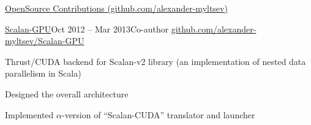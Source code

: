 \documentclass{resume} %
\begin{document}
\begin{rSection}{\href{https://github.com/alexander-myltsev?tab=repositories}{OpenSource 
Contributions (github.com/alexander-myltsev)}}
\begin{comment}
\begin{samepage}
\begin{rSubsection}{\href{http://github.com/alexander-myltsev/RSlick}{RSlick}}{}{Author}{\href{http://github.com/alexander-myltsev/RSlick}{github.com/alexander-myltsev/RSlick}}
\item R-package for templating and unified access to relational databases
\end{rSubsection}
\end{samepage}

\begin{samepage}
\begin{rSubsection}{\href{http://github.com/alexander-myltsev/sbt-uglify}{sbt-uglify}}{}{Author}{\href{http://github.com/alexander-myltsev/sbt-uglify}{github.com/alexander-myltsev/sbt-uglify}}
\item Scala SBT plugin that compresses JavaScript/mustache files with UglifyJS
\end{rSubsection}
\end{samepage}
\end{comment}

\begin{samepage}
\begin{rSubsection}{\href{http://github.com/alexander-myltsev/Scalan-GPU}
  {Scalan-GPU}}{Oct 2012 -- Mar 2013}{Co-author}
  {\href{http://github.com/alexander-myltsev/Scalan-GPU}{github.com/alexander-myltsev/Scalan-GPU}}
\item Thrust/CUDA backend for Scalan-v2 library (an implementation of nested data parallelism in Scala)
\item Designed the overall architecture
\item Implemented $\alpha$-version of ``Scalan-CUDA'' translator and launcher
\end{rSubsection}
\end{samepage}

\begin{comment}
\begin{samepage}
\begin{rSubsectionEmpty}{\href{http://github.com/aspnet/Mvc}{ASP.NET MVC4}}{September 2012 -- November 2012}{Contributor}{\href{http://github.com/aspnet/Mvc}{github.com/aspnet/Mvc}}
\end{rSubsectionEmpty}
\end{samepage}
\end{comment}

\end{rSection}
\end{document}

